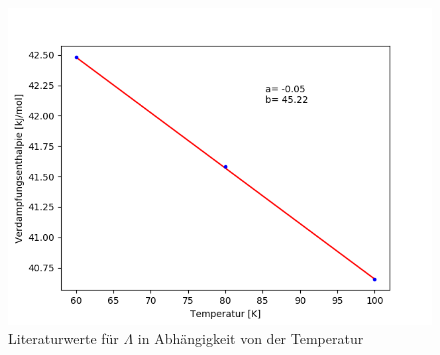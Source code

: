 \documentclass[12pt,a4paper]{article}
\begin{document}
\begin{figure}[H]
\begin{center}
\includegraphics[scale=0.9]{Bilder/Lambda_Literaturwert_fit.png}
\caption[Literaturwerte für $\Lambda$ in Abhängigkeit von der Temperatur]{Literaturwerte für $\Lambda$ in Abhängigkeit von der Temperatur}
\label{fig:LiteraturwertLambda}
\end{center}
\end{figure}
\end{document}
